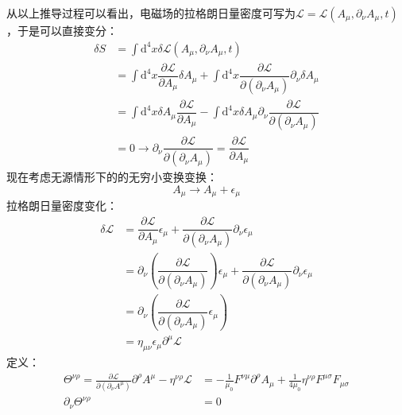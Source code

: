 \documentclass[12pt, a4paper, oneside]{ctexart}
\begin{document}
	\quad\quad 从以上推导过程可以看出，电磁场的拉格朗日量密度可写为$\mathcal{L}=\mathcal{L}(A_{\mu},\partial_{\nu}A_{\mu},t)$，于是可以直接变分：
	\begin{equation}
		\begin{aligned}
			\delta S&=\int \mathrm{d}^{4}x\delta\mathcal{L}(A_{\mu},\partial_{\nu}A_{\mu},t)\\
			&=\int\mathrm{d}^{4}x\dfrac{\partial\mathcal{L}}{\partial A_{\mu}}\delta A_{\mu}+\int\mathrm{d}^{4}x\dfrac{\partial\mathcal{L}}{\partial\left(\partial_{\nu}A_{\mu}\right)}\partial_{\nu}\delta A_{\mu}\\
			&=\int\mathrm{d}^{4}x\delta A_{\mu}\dfrac{\partial\mathcal{L}}{\partial A_{\mu}}-\int\mathrm{d}^{4}x\delta A_{\mu}\partial_{\nu}\dfrac{\partial\mathcal{L}}{\partial\left(\partial_{\nu}A_{\mu}\right)}\\
			&=0\to\partial_{\nu}\dfrac{\partial\mathcal{L}}{\partial\left(\partial_{\nu}A_{\mu}\right)}=\dfrac{\partial\mathcal{L}}{\partial A_{\mu}}
		\end{aligned}
	\end{equation}
	\quad\quad 现在考虑无源情形下的的无穷小变换变换：
	\begin{equation}
		A_{\mu}\to A_{\mu}+\epsilon_{\mu}
	\end{equation}
	\quad\quad 拉格朗日量密度变化：
	\begin{equation}
		\begin{aligned}
			\delta\mathcal{L}&=\dfrac{\partial\mathcal{L}}{\partial A_{\mu}}\epsilon_{\mu}+\dfrac{\partial\mathcal{L}}{\partial\left(\partial_{\nu}A_{\mu}\right)}\partial_{\nu}\epsilon_{\mu}\\
			&=\partial_{\nu}\left(\dfrac{\partial\mathcal{L}}{\partial\left(\partial_{\nu}A_{\mu}\right)}\right)\epsilon_{\mu}+\dfrac{\partial\mathcal{L}}{\partial\left(\partial_{\nu}A_{\mu}\right)}\partial_{\nu}\epsilon_{\mu}\\
			&=\partial_{\nu}\left(\dfrac{\partial\mathcal{L}}{\partial\left(\partial_{\nu}A_{\mu}\right)}\epsilon_{\mu}\right)\\
			&=\eta_{\mu\nu}\epsilon_{\mu}\partial^{\mu}\mathcal{L}
		\end{aligned}
	\end{equation}
	\quad\quad 定义：
	\begin{equation}
	\begin{aligned}
		\Theta^{\nu \rho}=\frac{\partial \mathcal{L}}{\partial\left(\partial_{\nu} A^{\mu}\right)} \partial^{\rho} A^{\mu}-\eta^{\nu \rho} \mathcal{L}&=-\frac{1}{\mu_{0}} F^{\nu \mu} \partial^{\rho} A_{\mu}+\frac{1}{4 \mu_{0}} \eta^{\nu \rho} F^{\mu \sigma} F_{\mu \sigma}\\
		\partial_{\nu} \Theta^{\nu \rho}&=0
	\end{aligned}
	\end{equation}
\end{document}
